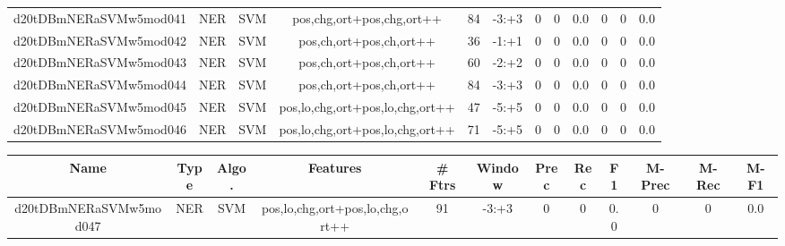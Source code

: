 \documentclass[a4paper]{article}
\begin{document}
\begin{landscape}
\begin{center}
\begin{tabular}{ |c|c|c|c|c|c|c|c|c|c|c|c|}
 
 	
 	\small{ d20tDBmNERaSVMw5mod041 } & \small{ NER} & \small{  SVM }  & pos,chg,ort+pos,chg,ort++  &  84 &  \small{  -3:+3 }  &  0 & 0 & 0.0  &  0 & 0 & 0.0 \\
 	

 
 	
 	\small{ d20tDBmNERaSVMw5mod042 } & \small{ NER} & \small{  SVM }  & pos,ch,ort+pos,ch,ort++  &  36 &  \small{  -1:+1 }  &  0 & 0 & 0.0  &  0 & 0 & 0.0 \\
 	

 
 	
 	\small{ d20tDBmNERaSVMw5mod043 } & \small{ NER} & \small{  SVM }  & pos,ch,ort+pos,ch,ort++  &  60 &  \small{  -2:+2 }  &  0 & 0 & 0.0  &  0 & 0 & 0.0 \\
 	

 
 	
 	\small{ d20tDBmNERaSVMw5mod044 } & \small{ NER} & \small{  SVM }  & pos,ch,ort+pos,ch,ort++  &  84 &  \small{  -3:+3 }  &  0 & 0 & 0.0  &  0 & 0 & 0.0 \\
 	

 
 	
 	\small{ d20tDBmNERaSVMw5mod045 } & \small{ NER} & \small{  SVM }  & pos,lo,chg,ort+pos,lo,chg,ort++  &  47 &  \small{  -5:+5 }  &  0 & 0 & 0.0  &  0 & 0 & 0.0 \\
 	

 
 	
 	\small{ d20tDBmNERaSVMw5mod046 } & \small{ NER} & \small{  SVM }  & pos,lo,chg,ort+pos,lo,chg,ort++  &  71 &  \small{  -5:+5 }  &  0 & 0 & 0.0  &  0 & 0 & 0.0 \\
 	
 \hline
\end{tabular}
\end{center}




\begin{center}
\begin{tabular}{ |c|c|c|c|c|c|c|c|c|c|c|c|} 
 \hline
 	Name & Type & Algo. & Features & \# Ftrs & Window & Prec & Rec & F1 & M-Prec & M-Rec & M-F1\\
 \hline

 	

 
 	
 	\small{ d20tDBmNERaSVMw5mod047 } & \small{ NER} & \small{  SVM }  & pos,lo,chg,ort+pos,lo,chg,ort++  &  91 &  \small{  -3:+3 }  &  0 & 0 & 0.0  &  0 & 0 & 0.0 \\
 	

 
 	

\end{tabular}
\end{center}
\end{landscape}
\end{document}
